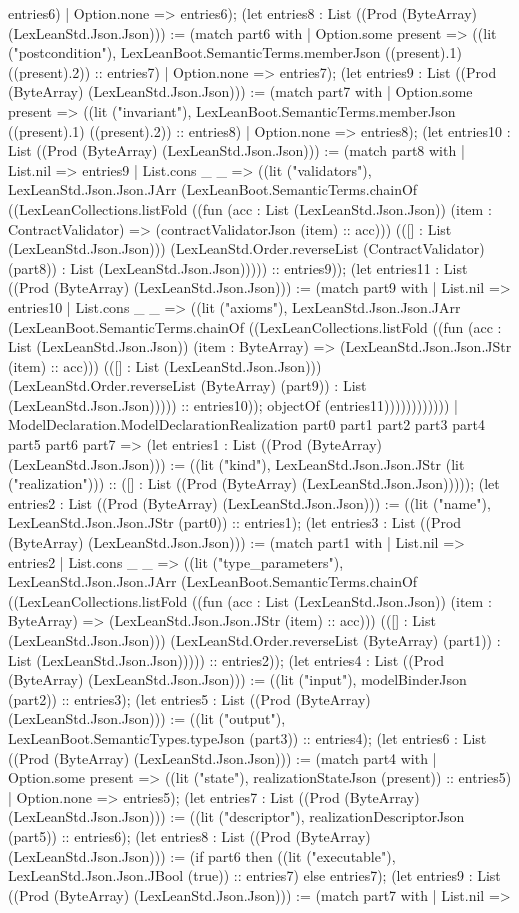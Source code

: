 \documentclass[11pt]{article}
\begin{document}
entries6) | Option.none => entries6); (let entries8 : List ((Prod (ByteArray) (LexLeanStd.Json.Json))) := (match part6 with | Option.some present => ((lit ("postcondition"), LexLeanBoot.SemanticTerms.memberJson ((present).1) ((present).2)) :: entries7) | Option.none => entries7); (let entries9 : List ((Prod (ByteArray) (LexLeanStd.Json.Json))) := (match part7 with | Option.some present => ((lit ("invariant"), LexLeanBoot.SemanticTerms.memberJson ((present).1) ((present).2)) :: entries8) | Option.none => entries8); (let entries10 : List ((Prod (ByteArray) (LexLeanStd.Json.Json))) := (match part8 with | List.nil => entries9 | List.cons \_ \_ => ((lit ("validators"), LexLeanStd.Json.Json.JArr (LexLeanBoot.SemanticTerms.chainOf ((LexLeanCollections.listFold ((fun (acc : List (LexLeanStd.Json.Json)) (item : ContractValidator) => (contractValidatorJson (item) :: acc))) (([] : List (LexLeanStd.Json.Json))) (LexLeanStd.Order.reverseList (ContractValidator) (part8)) : List (LexLeanStd.Json.Json))))) :: entries9)); (let entries11 : List ((Prod (ByteArray) (LexLeanStd.Json.Json))) := (match part9 with | List.nil => entries10 | List.cons \_ \_ => ((lit ("axioms"), LexLeanStd.Json.Json.JArr (LexLeanBoot.SemanticTerms.chainOf ((LexLeanCollections.listFold ((fun (acc : List (LexLeanStd.Json.Json)) (item : ByteArray) => (LexLeanStd.Json.Json.JStr (item) :: acc))) (([] : List (LexLeanStd.Json.Json))) (LexLeanStd.Order.reverseList (ByteArray) (part9)) : List (LexLeanStd.Json.Json))))) :: entries10)); objectOf (entries11)))))))))))) | ModelDeclaration.ModelDeclarationRealization part0 part1 part2 part3 part4 part5 part6 part7 => (let entries1 : List ((Prod (ByteArray) (LexLeanStd.Json.Json))) := ((lit ("kind"), LexLeanStd.Json.Json.JStr (lit ("realization"))) :: ([] : List ((Prod (ByteArray) (LexLeanStd.Json.Json))))); (let entries2 : List ((Prod (ByteArray) (LexLeanStd.Json.Json))) := ((lit ("name"), LexLeanStd.Json.Json.JStr (part0)) :: entries1); (let entries3 : List ((Prod (ByteArray) (LexLeanStd.Json.Json))) := (match part1 with | List.nil => entries2 | List.cons \_ \_ => ((lit ("type\_parameters"), LexLeanStd.Json.Json.JArr (LexLeanBoot.SemanticTerms.chainOf ((LexLeanCollections.listFold ((fun (acc : List (LexLeanStd.Json.Json)) (item : ByteArray) => (LexLeanStd.Json.Json.JStr (item) :: acc))) (([] : List (LexLeanStd.Json.Json))) (LexLeanStd.Order.reverseList (ByteArray) (part1)) : List (LexLeanStd.Json.Json))))) :: entries2)); (let entries4 : List ((Prod (ByteArray) (LexLeanStd.Json.Json))) := ((lit ("input"), modelBinderJson (part2)) :: entries3); (let entries5 : List ((Prod (ByteArray) (LexLeanStd.Json.Json))) := ((lit ("output"), LexLeanBoot.SemanticTypes.typeJson (part3)) :: entries4); (let entries6 : List ((Prod (ByteArray) (LexLeanStd.Json.Json))) := (match part4 with | Option.some present => ((lit ("state"), realizationStateJson (present)) :: entries5) | Option.none => entries5); (let entries7 : List ((Prod (ByteArray) (LexLeanStd.Json.Json))) := ((lit ("descriptor"), realizationDescriptorJson (part5)) :: entries6); (let entries8 : List ((Prod (ByteArray) (LexLeanStd.Json.Json))) := (if part6 then ((lit ("executable"), LexLeanStd.Json.Json.JBool (true)) :: entries7) else entries7); (let entries9 : List ((Prod (ByteArray) (LexLeanStd.Json.Json))) := (match part7 with | List.nil => 
\end{document}

